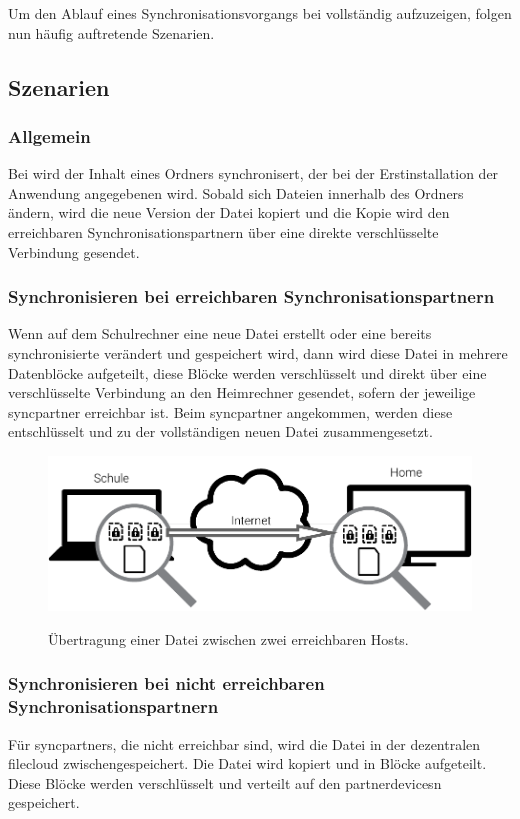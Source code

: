 Um den Ablauf eines Synchronisationsvorgangs bei \sblit vollständig aufzuzeigen,
folgen nun häufig auftretende Szenarien.

\subsection{Szenarien}
\subsubsection{Allgemein}
Bei \sblit wird der Inhalt eines Ordners synchronisert, der bei der
Erstinstallation der Anwendung angegebenen wird. Sobald sich Dateien innerhalb des Ordners
ändern, wird die neue Version der Datei kopiert und die Kopie wird den
erreichbaren Synchronisationspartnern über eine direkte verschlüsselte Verbindung
gesendet.

\subsubsection{Synchronisieren bei erreichbaren Synchronisationspartnern}
Wenn auf dem Schulrechner eine neue Datei erstellt oder eine bereits synchronisierte verändert und
gespeichert wird, dann wird diese Datei in mehrere Datenblöcke
aufgeteilt, diese Blöcke werden verschlüsselt und direkt über eine verschlüsselte
Verbindung an den Heimrechner gesendet, sofern der jeweilige \gls{syncpartner}
erreichbar ist. Beim \gls{syncpartner} angekommen, werden diese
entschlüsselt und zu der vollständigen neuen Datei zusammengesetzt.

\begin{figure}[htb]
	\centering
  \includegraphics[]{images/sblit_p2p}
	\label{sblit_p2p}
  \caption{Übertragung einer Datei zwischen zwei erreichbaren Hosts.}
\end{figure}

\subsubsection{Synchronisieren bei nicht erreichbaren Synchronisationspartnern}
Für \glspl{syncpartner}, die nicht erreichbar sind, wird die Datei in der dezentralen
\gls{filecloud} zwischengespeichert. Die Datei wird kopiert und in Blöcke
aufgeteilt. Diese Blöcke werden verschlüsselt und verteilt auf den
\glspl{partnerdevice}n gespeichert.

